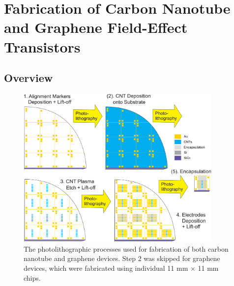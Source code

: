 \documentclass[
  a4paper,
]{scrbook}
\begin{document}
\hypertarget{sec-qw-processing}{%
\section{Fabrication of Carbon Nanotube and Graphene Field-Effect
Transistors}\label{sec-qw-processing}}

\hypertarget{overview}{%
\subsection{Overview}\label{overview}}

\begin{figure}

{\centering \includegraphics[width=0.9\textwidth,height=\textheight]{figures/ch4/photolithography-cycle.png}

}

\caption{\label{fig-qw-photolithography}The photolithographic processes
used for fabrication of both carbon nanotube and graphene devices. Step
2 was skipped for graphene devices, which were fabricated using
individual 11 mm \(\times\) 11 mm chips.}

\end{figure}
\end{document}
